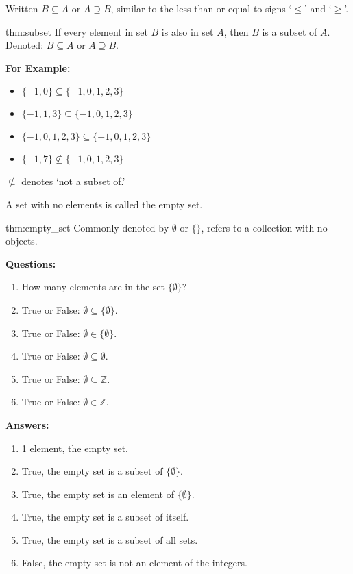 \noindent
Written $B \subseteq A$ or $A \supseteq B$, similar to the less than or
equal to signs `$\leq$' and `$\geq$'.

\begin{theo}[Subset]{thm:subset}
    If every element in set $B$ is also in set $A$, then $B$ is a subset of $A$.\\
    Denoted: $B \subseteq A$ or $A \supseteq B$.
\end{theo}

\noindent
\textbf{For Example:}
\begin{itemize}
    \item $\{-1, 0\} \subseteq \{-1, 0, 1, 2, 3\}$
    \item $\{-1, 1, 3\} \subseteq \{-1, 0, 1, 2, 3\}$
    \item $\{-1, 0, 1, 2, 3\} \subseteq \{-1, 0, 1, 2, 3\}$
    \item $\{-1, 7\} \not\subseteq \{-1, 0, 1, 2, 3\}$
\end{itemize}

\underline{$\not\subseteq$ denotes `not a subset of.'}

\vspace{1em}
\noindent
A set with no elements is called the empty set.
\begin{theo}{thm:empty_set}
    Commonly denoted by $\emptyset$ or $\{\}$, refers to a collection with no objects.
\end{theo}

\newpage
\noindent
\textbf{Questions:}
\begin{enumerate}
    \item How many elements are in the set  $\{\emptyset\}$?
    \item True or False: $\emptyset \subseteq \{\emptyset\}$.
    \item True or False: $\emptyset \in \{\emptyset\}$.
    \item True or False: $\emptyset \subseteq \emptyset$.
    \item True or False: $\emptyset \subseteq \mathbb{Z}$.
    \item True or False: $\emptyset \in \mathbb{Z}$.
\end{enumerate}

\noindent
\textbf{Answers:}
\begin{enumerate}
    \item 1 element, the empty set.
    \item True, the empty set is a subset of $\{\emptyset\}$.
    \item True, the empty set is an element of $\{\emptyset\}$.
    \item True, the empty set is a subset of itself.
    \item True, the empty set is a subset of all sets.
    \item False, the empty set is not an element of the integers.
\end{enumerate}



